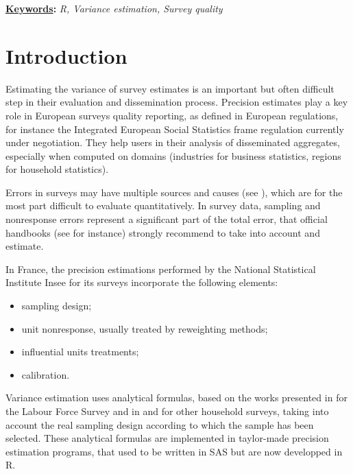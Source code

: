\documentclass[12pt,a4paper]{article}
\title{
\vspace{-5ex}
\thetitle
\vspace{-2ex}
}
\date{}
\def\thekeywords{
\textit{R, Variance estimation, Survey quality}
}
\begin{document}
\cfoot{\thepage} %

\sectionfont{\large\textsc}

\maketitle

{\fontsize{10pt}{12.0pt}\selectfont \textbf{\uline{Keywords}:} \thekeywords\par}\par


\section{ Introduction}

\par Estimating the variance of survey estimates is an important but often difficult step in their evaluation and dissemination process. Precision estimates play a key role in European surveys quality reporting, as defined in European regulations, for instance the Integrated European Social Statistics frame regulation currently under negotiation. They help users in their analysis of disseminated aggregates, especially when computed on domains (industries for business statistics, regions for household statistics).\\

\par Errors in surveys may have multiple sources and causes (see \cite{Biemer2010}), which are for the most part difficult to evaluate quantitatively. In survey data, sampling and nonresponse errors represent a significant part of the total error, that official handbooks (see \cite{EHQR2014} for instance) strongly recommend to take into account and estimate.\\

\par In France, the precision estimations performed by the National Statistical Institute Insee for its surveys incorporate the following elements: 
\begin{itemize}
\item sampling design;
\item unit nonresponse, usually treated by reweighting methods;
\item influential units treatments;
\item calibration.
\end{itemize}
Variance estimation uses analytical formulas, based on the works presented in \cite{Gros2016} for the Labour Force Survey and in \cite{Breidt2011} and \cite{Gros2015} for other household surveys, taking into account the real sampling design according to which the sample has been selected. These analytical formulas are implemented in taylor-made precision estimation programs, that used to be written in SAS but are now developped in R. \\
\end{document}
